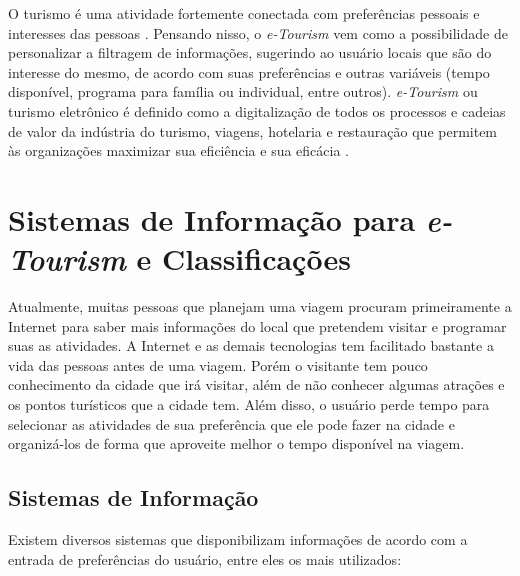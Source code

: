 O turismo é uma atividade fortemente conectada com preferências pessoais e interesses das pessoas \citep{4669760}. Pensando nisso, o \textit{e-Tourism} vem como a possibilidade de personalizar a filtragem de informações, sugerindo ao usuário locais que são do interesse do mesmo, de acordo com suas preferências e outras variáveis (tempo disponível, programa para família ou individual, entre outros). \textit{e-Tourism} ou turismo eletrônico é definido como a digitalização de todos os processos e cadeias de valor da indústria do turismo, viagens, hotelaria e restauração que permitem às organizações maximizar sua eficiência e sua eficácia \citep{Moura:2013:DUT:2526188.2526215}.

\section{Sistemas de Informação para \textit{e-Tourism} e Classificações}
\label{sec:eTourism_infosys_classification}

Atualmente, muitas pessoas que planejam uma viagem procuram primeiramente a Internet para saber mais informações do local que pretendem visitar e programar suas as atividades. A Internet e as demais tecnologias tem facilitado bastante a vida das pessoas antes de uma viagem. Porém o visitante tem pouco conhecimento da cidade que irá visitar, além de não conhecer algumas atrações e os pontos turísticos que a cidade tem. Além disso, o usuário perde tempo para selecionar as atividades de sua preferência que ele pode fazer na cidade e organizá-los de forma que aproveite melhor o tempo disponível na viagem.

\subsection{Sistemas de Informação}
\label{subsec:eTourism_infoSys}

Existem diversos sistemas que disponibilizam informações de acordo com a entrada de preferências do usuário, entre eles os mais utilizados:

